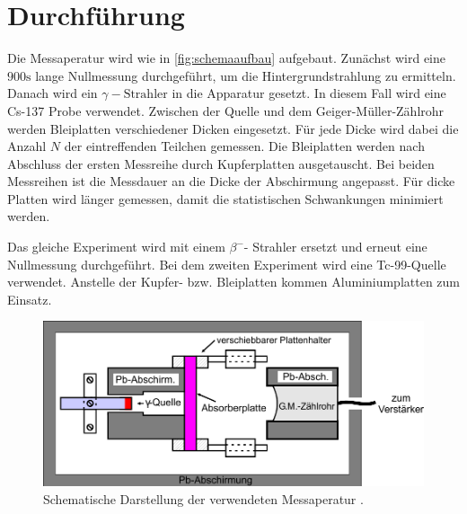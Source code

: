 \section{Durchführung}
\label{sec:Durchführung}
Die Messaperatur wird wie in \autoref{fig:schemaaufbau} aufgebaut. 
Zunächst wird eine $900 \unit{\second}$ lange Nullmessung durchgeführt, um die Hintergrundstrahlung zu ermitteln.
Danach wird ein $\gamma- \text{Strahler}$ in die Apparatur gesetzt. 
In diesem Fall wird eine Cs-137 Probe verwendet. 
Zwischen der Quelle und dem Geiger-Müller-Zählrohr werden Bleiplatten verschiedener Dicken eingesetzt.
Für jede Dicke wird dabei die Anzahl $N$ der eintreffenden Teilchen gemessen.
Die Bleiplatten werden nach Abschluss der ersten Messreihe durch Kupferplatten ausgetauscht. 
Bei beiden Messreihen ist die Messdauer an die Dicke der Abschirmung angepasst. 
Für dicke Platten wird länger gemessen, damit die statistischen Schwankungen minimiert werden.

Das gleiche Experiment wird mit einem $\beta^{-}$- Strahler ersetzt und erneut eine Nullmessung durchgeführt. 
Bei dem zweiten Experiment wird eine Tc-99-Quelle verwendet.
Anstelle der Kupfer- bzw. Bleiplatten kommen Aluminiumplatten zum Einsatz.

\begin{figure}[H]
    \centering
    \includegraphics{figures/abb7.pdf}
    \caption{Schematische Darstellung der verwendeten Messaperatur \cite{ap04}.} 
    \label{fig:schemaaufbau}
\end{figure}